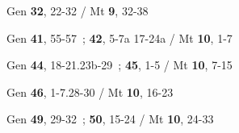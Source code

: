 {{\item[Feria III] Gen \textbf{32}, 22-32 / Mt \textbf{9}, 32-38
\item[Feria IV] Gen \textbf{41}, 55-57~; \textbf{42}, 5-7a 17-24a / Mt \textbf{10}, 1-7
\item[Feria V] Gen \textbf{44}, 18-21.23b-29~; \textbf{45}, 1-5 / Mt \textbf{10}, 7-15
\item[Feria VI] Gen \textbf{46}, 1-7.28-30 / Mt \textbf{10}, 16-23
\item[Sabbato] Gen \textbf{49}, 29-32~; \textbf{50}, 15-24 / Mt \textbf{10}, 24-33}
\ApplyBody{

}}
